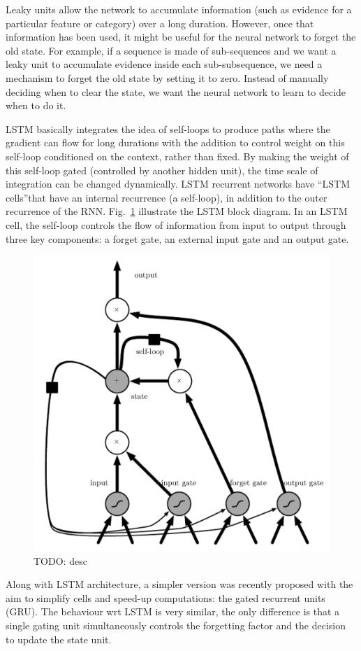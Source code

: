 Leaky units allow the network to accumulate information (such as
evidence for a particular feature or category) over a long duration.
However, once that information has been used, it might be useful for
the neural network to forget the old state. For example, if a sequence
is made of sub-sequences and we want a leaky unit to accumulate
evidence inside each sub-subsequence, we need a mechanism to forget
the old state by setting it to zero. Instead of manually deciding when
to clear the state, we want the neural network to learn to decide when
to do it.

LSTM basically integrates the idea of self-loops to produce paths
where the gradient can ﬂow for long durations with the addition to
control weight on this self-loop conditioned on the context, rather
than ﬁxed. By making the weight of this self-loop gated (controlled by
another hidden unit), the time scale of integration can be changed
dynamically. LSTM recurrent networks have ``LSTM cells''that have an
internal recurrence (a self-loop), in addition to the outer recurrence
of the RNN. Fig.~\ref{fig:lstm} illustrate the LSTM block diagram. In
an LSTM cell, the self-loop controls the flow of information from
input to output through three key components: a forget gate, an
external input gate and an output gate.

\begin{figure}
  \centering
  \includegraphics[width=.6\textwidth]{figures/lstm.png}
  \caption[TODO]{TODO: desc}
  \label{fig:lstm}
\end{figure}

Along with LSTM architecture, a simpler version was recently proposed
with the aim to simplify cells and speed-up computations: the gated
recurrent units (GRU). The behaviour wrt LSTM is very similar, the
only difference is that a single gating unit simultaneously controls
the forgetting factor and the decision to update the state unit.

